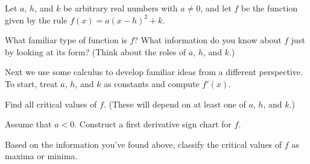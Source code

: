 \begin{pa} \label{PA:3.2}
Let $a$, $h$, and $k$ be arbitrary real numbers with $a \ne 0$, and let  $f$ be the function given by the rule $f(x) = a(x-h)^2 + k$.
\ba
	\item What familiar type of function is $f$?  What information do you know about $f$ just by looking at its form? (Think about the roles of $a$, $h$, and $k$.)
	\item Next we use some calculus to develop familiar ideas from a different perspective.  To start, treat $a$, $h$, and $k$ as constants and compute $f'(x)$.
	\item Find all critical values of $f$. (These will depend on at least one of $a$, $h$, and $k$.)
	\item Assume that $a < 0$.  Construct a first derivative sign chart for $f$.
	\item Based on the information you've found above, classify the critical values of $f$ as maxima or minima.
\ea
\end{pa} \afterpa